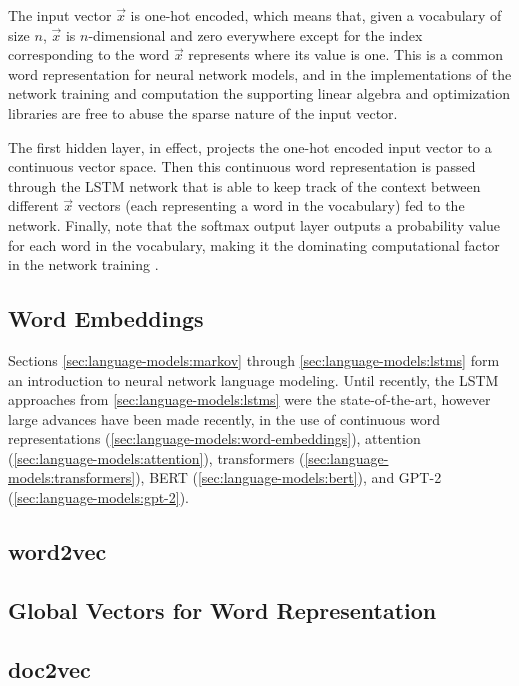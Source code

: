 The input vector $\vec x$ is one-hot encoded, which means that, given a vocabulary of size $n$, $\vec x$ is $n$-dimensional and zero everywhere except for the index corresponding to the word $\vec x$ represents where its value is one.
This is a common word representation for neural network models, and in the implementations of the network training and computation the supporting linear algebra and optimization libraries are free to abuse the sparse nature of the input vector.

The first hidden layer, in effect, projects the one-hot encoded input vector to a continuous vector space.
Then this continuous word representation is passed through the LSTM network that is able to keep track of the context between different $\vec x$ vectors (each representing a word in the vocabulary) fed to the network.
Finally, note that the softmax output layer outputs a probability value for each word in the vocabulary, making it the dominating computational factor in the network training \cite{Sundermeyer2012LSTMNN}.

\subsection{Word Embeddings}\label{sec:language-models:word-embeddings}
Sections \autoref{sec:language-models:markov} through \autoref{sec:language-models:lstms} form an introduction to neural network language modeling.
Until recently, the LSTM approaches from \autoref{sec:language-models:lstms} were the state-of-the-art, however large advances have been made recently, in the use of continuous word representations (\autoref{sec:language-models:word-embeddings}), attention (\autoref{sec:language-models:attention}), transformers (\autoref{sec:language-models:transformers}), BERT (\autoref{sec:language-models:bert}), and GPT-2 (\autoref{sec:language-models:gpt-2}).


\subsection{word2vec}\label{sec:language-models:word2vec}
\subsection{Global Vectors for Word Representation}\label{sec:language-models:glove}
\subsection{doc2vec}\label{sec:language-models:doc2vec}

